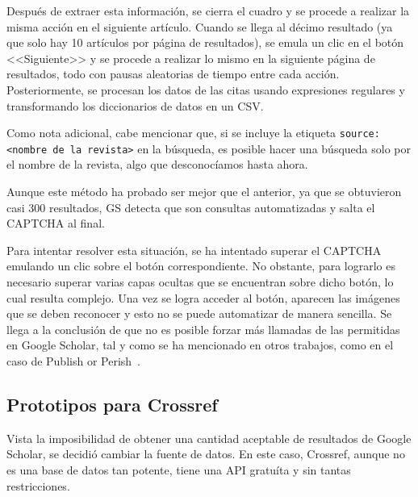 Después de extraer esta información, se cierra el cuadro y se procede a realizar la misma acción en el siguiente artículo. Cuando se llega al décimo resultado (ya que solo hay 10 artículos por página de resultados), se emula un clic en el botón <<Siguiente>> y se procede a realizar lo mismo en la siguiente página de resultados, todo con pausas aleatorias de tiempo entre cada acción. Posteriormente, se procesan los datos de las citas usando expresiones regulares y transformando los diccionarios de datos en un CSV.

Como nota adicional, cabe mencionar que, si se incluye la etiqueta \texttt{source: <nombre de la revista>} en la búsqueda, es posible hacer una búsqueda solo por el nombre de la revista, algo que desconocíamos hasta ahora.

Aunque este método ha probado ser mejor que el anterior, ya que se obtuvieron casi 300 resultados, GS detecta que son consultas automatizadas y salta el CAPTCHA al final.

Para intentar resolver esta situación, se ha intentado superar el CAPTCHA emulando un clic sobre el botón correspondiente. No obstante, para lograrlo es necesario superar varias capas ocultas que se encuentran sobre dicho botón, lo cual resulta complejo. Una vez se logra acceder al botón, aparecen las imágenes que se deben reconocer y esto no se puede automatizar de manera sencilla. Se llega a la conclusión de que no es posible forzar más llamadas de las permitidas en Google Scholar, tal y como se ha mencionado en otros trabajos, como en el caso de Publish or Perish~\cite{harzing2010}.



\subsection{Prototipos para Crossref}

Vista la imposibilidad de obtener una cantidad aceptable de resultados de Google Scholar, se decidió cambiar la fuente de datos. En este caso, Crossref, aunque no es una base de datos tan potente, tiene una API gratuíta y sin tantas restricciones.


